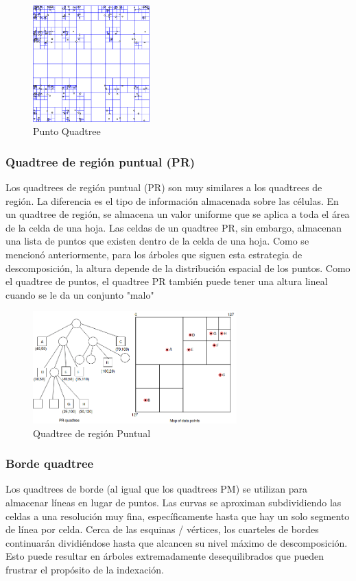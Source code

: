 \documentclass{article}
\begin{document}
\begin{figure}[H]
\centering
\includegraphics[width=0.4\textwidth]{img/quadv3.jpg}
\caption{Punto Quadtree}
\end{figure}

\subsubsection{Quadtree de región puntual (PR)}

Los quadtrees de región puntual (PR) son muy similares a los quadtrees de región. La diferencia es el tipo de información almacenada sobre las células. En un quadtree de región, se almacena un valor uniforme que se aplica a toda el área de la celda de una hoja. Las celdas de un quadtree PR, sin embargo, almacenan una lista de puntos que existen dentro de la celda de una hoja. Como se mencionó anteriormente, para los árboles que siguen esta estrategia de descomposición, la altura depende de la distribución espacial de los puntos. Como el quadtree de puntos, el quadtree PR también puede tener una altura lineal cuando se le da un conjunto "malo"

\begin{figure}[H]
\centering
\includegraphics[width=0.7\textwidth]{img/quadPR.png}
\caption{Quadtree de región Puntual}
\end{figure}

\subsubsection{Borde quadtree}
Los quadtrees de borde  (al igual que los quadtrees PM) se utilizan para almacenar líneas en lugar de puntos. Las curvas se aproximan subdividiendo las celdas a una resolución muy fina, específicamente hasta que hay un solo segmento de línea por celda. Cerca de las esquinas / vértices, los cuarteles de bordes continuarán dividiéndose hasta que alcancen su nivel máximo de descomposición. Esto puede resultar en árboles extremadamente desequilibrados que pueden frustrar el propósito de la indexación.
\end{document}
